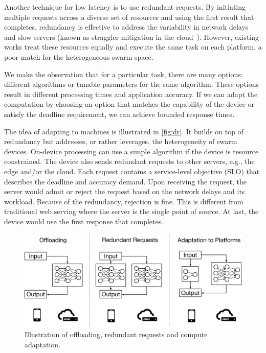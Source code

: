 Another technique for low latency is to use redundant requests. By initiating
multiple requests across a diverse set of resources and using the first result
that completes, redundancy is effective to address the variability in network
delays~\cite{gordon2015accelerating, vulimiri2013low} and slow servers (known as
straggler mitigation in the cloud~\cite{dean2013tail,
  ananthanarayanan2013effective}). However, existing works treat these resources
equally and execute the same task on each platform, a poor match for the
heterogeneous swarm space.

We make the observation that for a particular task, there are many options:
different algorithms or tunable parameters for the same algorithm. These options
result in different processing times and application accuracy. If we can adapt
the computation by choosing an option that matches the capability of the device
or satisfy the deadline requirement, we can achieve bounded response times.

The idea of adapting to machines is illustrated in \autoref{fig:dr}. It builds
on top of redundancy but addresses, or rather leverages, the heterogeneity of
swarm devices.  On-device processing can use a simple algorithm if the device is
resource constrained. The device also sends redundant requests to other servers,
e.g., the edge and/or the cloud. Each request contains a service-level objective
(SLO) that describes the deadline and accuracy demand. Upon receiving the
request, the server would admit or reject the request based on the network
delays and its workload. Because of the redundancy, rejection is fine. This is
different from traditional web serving where the server is the single point of
source. At last, the device would use the first response that completes.

\begin{figure}
  \centering
  \includegraphics[width=0.8\columnwidth]{figures/dr.pdf}
  \caption{Illustration of offloading, redundant requests and compute
    adaptation.}
  \label{fig:dr}
\end{figure}

